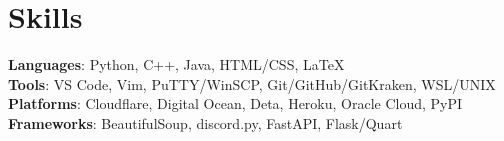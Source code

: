 \documentclass[letterpaper,11pt]{article}
\begin{document}
\section{Skills}
\begin{itemize}[leftmargin=0.15in, label={}]
  \small{\item{
                \textbf{Languages}{: Python, C++, Java, HTML/CSS, \LaTeX} \\
                \textbf{Tools}{: VS Code, Vim, PuTTY/WinSCP, Git/GitHub/GitKraken, WSL/UNIX} \\
                \textbf{Platforms}{: Cloudflare, Digital Ocean, Deta, Heroku, Oracle Cloud, PyPI} \\
                \textbf{Frameworks}{: BeautifulSoup, discord.py, FastAPI, Flask/Quart} \\
          }}
\end{itemize}
\end{document}

